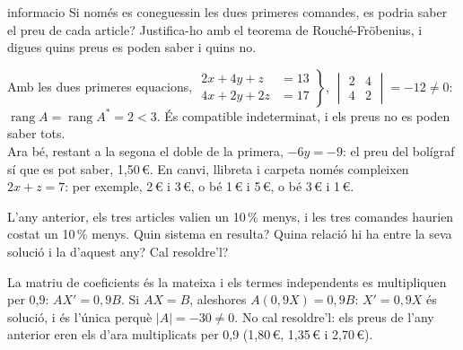 \begin{apartats}
\begin{tria}{informacio}
Si només es coneguessin les dues primeres comandes, es podria saber el preu de cada article? Justifica-ho
amb el teorema de Rouché-Fröbenius, i digues quins preus es poden saber i quins no.

\begin{solucio}
Amb les dues primeres equacions, $\left.\begin{aligned}2x+4y+z&=13\\4x+2y+2z&=17\end{aligned}\right\}$,
$\begin{vmatrix}2&4\\4&2\end{vmatrix}=-12\ne0$: $\operatorname{rang}A=\operatorname{rang}A^*=2<3$. És
compatible indeterminat, i els preus no es poden saber tots.\\
Ara bé, restant a la segona el doble de la primera, $-6y=-9$: el preu del bolígraf sí que es pot saber,
1,50\,€. En canvi, llibreta i carpeta només compleixen $2x+z=7$: per exemple, 2\,€ i 3\,€, o bé 1\,€ i
5\,€, o bé 3\,€ i 1\,€.
\end{solucio}
\end{tria}

\begin{nomesllarg}
L'any anterior, els tres articles valien un 10\,\% menys, i les tres comandes haurien costat un 10\,\%
menys. Quin sistema en resulta? Quina relació hi ha entre la seva solució i la d'aquest any? Cal
resoldre'l?

\begin{solucio}
La matriu de coeficients és la mateixa i els termes independents es multipliquen per 0,9:
$AX'=0{,}9B$. Si $AX=B$, aleshores $A(0{,}9X)=0{,}9B$: $X'=0{,}9X$ és solució, i és l'única perquè
$|A|=-30\ne0$. No cal resoldre'l: els preus de l'any anterior eren els d'ara multiplicats per 0,9
(1,80\,€, 1,35\,€ i 2,70\,€).
\end{solucio}
\end{nomesllarg}

\end{apartats}
